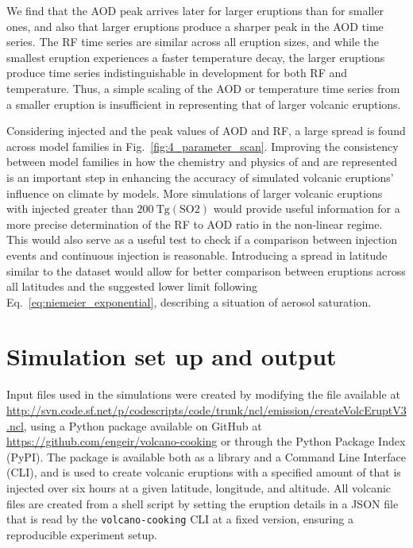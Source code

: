 \documentclass[draft]{agujournal2019}
\begin{document}
We find that the AOD peak arrives later for larger eruptions than for smaller ones, and
also that larger eruptions produce a sharper peak in the AOD time series. The RF time
series are similar across all eruption sizes, and while the smallest eruption
experiences a faster temperature decay, the larger eruptions produce time series
indistinguishable in development for both RF and temperature. Thus, a simple scaling of
the AOD or temperature time series from a smaller eruption is insufficient in
representing that of larger volcanic eruptions.

Considering injected  and the peak values of AOD and RF, a large spread is found
across model families in Fig.~\ref{fig:4_parameter_scan}. Improving the consistency
between model families in how the chemistry and physics of  and  are
represented is an important step in enhancing the accuracy of simulated volcanic
eruptions' influence on climate by models. More simulations of larger volcanic eruptions
with injected  greater than \(\SI{200}{\tera\gram(\mathrm{SO2})}\) would provide
useful information for a more precise determination of the RF to AOD ratio in the
non-linear regime. This would also serve as a useful test to check if a comparison
between  injection events and continuous  injection is reasonable.
Introducing a spread in latitude similar to the  dataset
would allow for better comparison between eruptions across all latitudes and the
suggested lower limit following Eq.~\ref{eq:niemeier_exponential}, describing a
situation of aerosol saturation.


%
%
%
%
\appendix
\section{Simulation set up and output}

Input files used in the simulations were created by modifying the file available at
\url{http://svn.code.sf.net/p/codescripts/code/trunk/ncl/emission/createVolcEruptV3.ncl},
using a Python package available on GitHub at
\url{https://github.com/engeir/volcano-cooking} or through the Python Package Index
(PyPI). The package is available both as a library and a Command Line Interface (CLI),
and is used to create volcanic eruptions with a specified amount of  that is
injected over six hours at a given latitude, longitude, and altitude. All volcanic
 files are created from a shell script by setting the eruption details in a JSON
file that is read by the \texttt{volcano-cooking} CLI at a fixed version, ensuring a
reproducible experiment setup.
\end{document}
